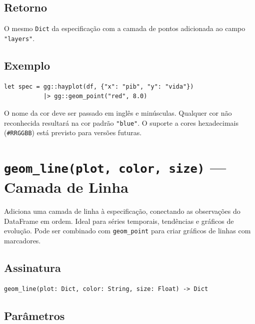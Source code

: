 \documentclass[12pt, a4paper, oneside]{book}
\newcommand{\code}[1]{\texttt{#1}}
\begin{document}
\subsection*{Retorno}

O mesmo \code{Dict} da especificação com a camada de pontos adicionada ao
campo \code{"layers"}.

\subsection*{Exemplo}

\begin{lstlisting}[caption={Adicionando uma camada de dispersão}]
let spec = gg::hayplot(df, {"x": "pib", "y": "vida"})
           |> gg::geom_point("red", 8.0)
\end{lstlisting}

\begin{warnbox}[title={\textbf{Atenção:} Nota sobre cores}]
  O nome da cor deve ser passado em inglês e minúsculas. Qualquer cor
  não reconhecida resultará na cor padrão \code{"blue"}.
  O suporte a cores hexadecimais (\code{\#RRGGBB}) está previsto para versões futuras.
\end{warnbox}

\section{\texttt{geom\_line(plot, color, size)} --- Camada de Linha}

Adiciona uma camada de linha à especificação, conectando as observações do
DataFrame em ordem. Ideal para séries temporais, tendências e gráficos de evolução.
Pode ser combinado com \code{geom\_point} para criar gráficos de linhas com marcadores.

\subsection*{Assinatura}

\begin{lstlisting}[style=inline]
geom_line(plot: Dict, color: String, size: Float) -> Dict
\end{lstlisting}

\subsection*{Parâmetros}
\end{document}
